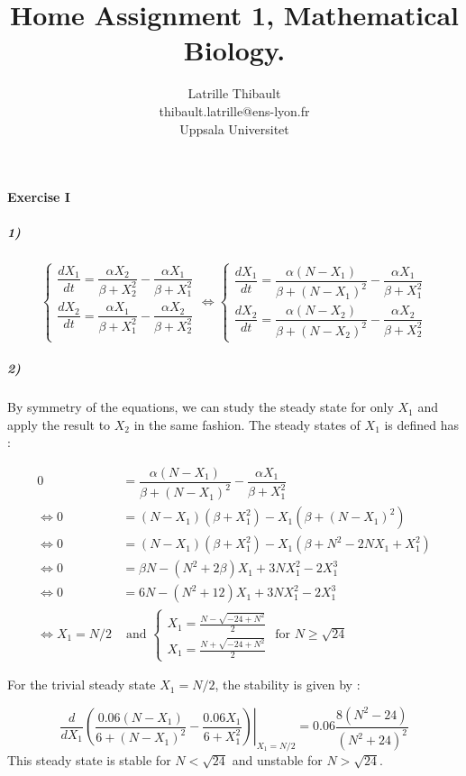 \documentclass{article}
\author{Latrille Thibault\\
\small thibault.latrille@ens-lyon.fr\\[-0.8ex]
\small Uppsala Universitet\\}
\title{Home Assignment 1, Mathematical Biology.}
\begin{document}
\maketitle
\paragraph{Exercise I}
\subparagraph{1)}
$$ \displaystyle \left \{
    \begin{array}{ll}
		\dfrac{d X_1}{dt}=\dfrac{\alpha X_2}{\beta + X_2^2}-\dfrac{\alpha X_1}{\beta + X_1^2} \\
		\dfrac{d X_2}{dt}=\dfrac{\alpha X_1}{\beta + X_1^2}-\dfrac{\alpha X_2}{\beta + X_2^2} \\
    \end{array}
    \right.
    \iff
    \left \{
     \begin{array}{ll}
        \dfrac{d X_1}{dt}=\dfrac{\alpha (N-X_1)}{\beta + (N-X_1)^2}-\dfrac{\alpha X_1}{\beta + X_1^2} \\
		\dfrac{d X_2}{dt}=\dfrac{\alpha (N-X_2)}{\beta + (N-X_2)^2}-\dfrac{\alpha X_2}{\beta + X_2^2} 
    \end{array}
    \right.
 $$
\subparagraph{2)}

By symmetry of the equations, we can study the steady state for only $X_1$ and apply the result to $X_2$ in the same fashion.
The steady states of $X_1$ is defined has :

\begin{align*}
        0 &=\dfrac{\alpha (N-X_1)}{\beta + (N-X_1)^2}-\dfrac{\alpha X_1}{\beta + X_1^2} \\
	\iff 0 &=(N-X_1)(\beta + X_1^2)- X_1(\beta + (N-X_1)^2) \\
	\iff 0 &=(N-X_1)(\beta + X_1^2)- X_1(\beta + N^2-2 N X_1+X_1^2) \\
	\iff 0 &=\beta N-(N^2+2\beta) X_1+3 N X_1^2 -2X_1^3 \\
	\iff 0 &=6 N-(N^2+12) X_1+3 N X_1^2 -2X_1^3 \\
 \iff X_1=N/2 & \text{ and }
	\left\{
	\begin{array}{ll}
		X_1=\frac{N-\sqrt{-24 +N^2}}{2} \\
		X_1=\frac{N+\sqrt{-24 +N^2}}{2}
    \end{array}
    \right.
    \text{ for } N \geq \sqrt{24}
\end{align*}

For the trivial steady state $X_1=N/2$, the stability is given by : 

$$ \dfrac{d}{dX_1} \left. \left(\dfrac{0.06 (N-X_1)}{6 + (N-X_1)^2}-\dfrac{0.06 X_1}{6 + X_1^2}\right) \right|_{X_1=N/2}=0.06\dfrac{8(N^2-24)}{(N^2+24)^2}$$
This steady state is stable for $N < \sqrt{24}$ and unstable for $N > \sqrt{24}$.\\
\end{document}
